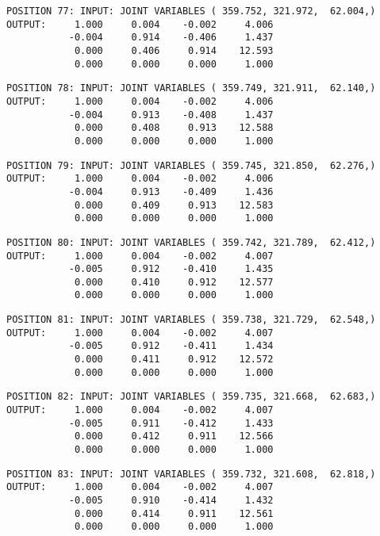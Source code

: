 \begin{verbatim}
POSITION 77: INPUT: JOINT VARIABLES ( 359.752, 321.972,  62.004,)
OUTPUT:     1.000     0.004    -0.002     4.006
           -0.004     0.914    -0.406     1.437
            0.000     0.406     0.914    12.593
            0.000     0.000     0.000     1.000
\end{verbatim} \pagebreak[1]\begin{verbatim}
POSITION 78: INPUT: JOINT VARIABLES ( 359.749, 321.911,  62.140,)
OUTPUT:     1.000     0.004    -0.002     4.006
           -0.004     0.913    -0.408     1.437
            0.000     0.408     0.913    12.588
            0.000     0.000     0.000     1.000
\end{verbatim} \pagebreak[1]\begin{verbatim}
POSITION 79: INPUT: JOINT VARIABLES ( 359.745, 321.850,  62.276,)
OUTPUT:     1.000     0.004    -0.002     4.006
           -0.004     0.913    -0.409     1.436
            0.000     0.409     0.913    12.583
            0.000     0.000     0.000     1.000
\end{verbatim} \pagebreak[1]\begin{verbatim}
POSITION 80: INPUT: JOINT VARIABLES ( 359.742, 321.789,  62.412,)
OUTPUT:     1.000     0.004    -0.002     4.007
           -0.005     0.912    -0.410     1.435
            0.000     0.410     0.912    12.577
            0.000     0.000     0.000     1.000
\end{verbatim} \pagebreak[1]\begin{verbatim}
POSITION 81: INPUT: JOINT VARIABLES ( 359.738, 321.729,  62.548,)
OUTPUT:     1.000     0.004    -0.002     4.007
           -0.005     0.912    -0.411     1.434
            0.000     0.411     0.912    12.572
            0.000     0.000     0.000     1.000
\end{verbatim} \pagebreak[1]\begin{verbatim}
POSITION 82: INPUT: JOINT VARIABLES ( 359.735, 321.668,  62.683,)
OUTPUT:     1.000     0.004    -0.002     4.007
           -0.005     0.911    -0.412     1.433
            0.000     0.412     0.911    12.566
            0.000     0.000     0.000     1.000
\end{verbatim} \pagebreak[1]\begin{verbatim}
POSITION 83: INPUT: JOINT VARIABLES ( 359.732, 321.608,  62.818,)
OUTPUT:     1.000     0.004    -0.002     4.007
           -0.005     0.910    -0.414     1.432
            0.000     0.414     0.911    12.561
            0.000     0.000     0.000     1.000
\end{verbatim} \pagebreak[1]\begin{verbatim}

\end{verbatim}
